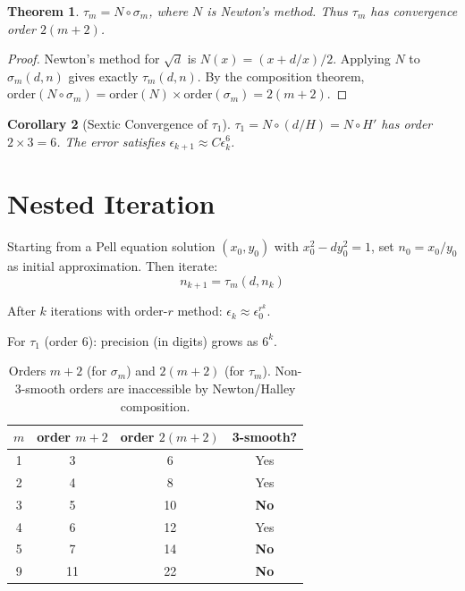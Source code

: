 \documentclass[11pt]{article}
\newtheorem{theorem}{Theorem}
\newtheorem{corollary}[theorem]{Corollary}
\theoremstyle{definition}
\theoremstyle{remark}
\begin{document}
\begin{theorem}
$\tau_m = N \circ \sigma_m$, where $N$ is Newton's method. Thus $\tau_m$ has
convergence order $2(m+2)$.
\end{theorem}

\begin{proof}
Newton's method for $\sqrt{d}$ is $N(x) = (x + d/x)/2$. Applying $N$ to
$\sigma_m(d,n)$ gives exactly $\tau_m(d,n)$. By the composition theorem,
$\text{order}(N \circ \sigma_m) = \text{order}(N) \times \text{order}(\sigma_m) = 2(m+2)$.
\end{proof}

\begin{corollary}[Sextic Convergence of $\tau_1$]
$\tau_1 = N \circ (d/H) = N \circ H'$ has order $2 \times 3 = 6$. The error
satisfies $\epsilon_{k+1} \approx C \epsilon_k^6$.
\end{corollary}

\section{Nested Iteration}

Starting from a Pell equation solution $(x_0, y_0)$ with $x_0^2 - dy_0^2 = 1$,
set $n_0 = x_0/y_0$ as initial approximation. Then iterate:
\begin{equation}
n_{k+1} = \tau_m(d, n_k)
\end{equation}

After $k$ iterations with order-$r$ method: $\epsilon_k \approx \epsilon_0^{r^k}$.

For $\tau_1$ (order 6): precision (in digits) grows as $6^k$.

\begin{table}[h]
\centering
\begin{tabular}{c|c|c|c}
$m$ & order $m+2$ & order $2(m+2)$ & 3-smooth? \\ \hline
1 & 3 & 6 & Yes \\
2 & 4 & 8 & Yes \\
3 & 5 & 10 & \textbf{No} \\
4 & 6 & 12 & Yes \\
5 & 7 & 14 & \textbf{No} \\
9 & 11 & 22 & \textbf{No} \\
\end{tabular}
\caption{Orders $m+2$ (for $\sigma_m$) and $2(m+2)$ (for $\tau_m$). Non-3-smooth
orders are inaccessible by Newton/Halley composition.}
\end{table}
\end{document}
